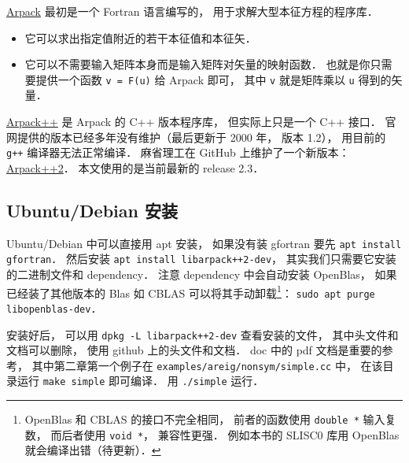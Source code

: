 
\begin{issues}
\issueDraft
\end{issues}


\href{https://www.caam.rice.edu/software/ARPACK/}{Arpack} 最初是一个 Fortran 语言编写的， 用于求解大型本征方程的程序库．
\begin{itemize}
\item 它可以求出指定值附近的若干本征值和本征矢．
\item 它可以不需要输入矩阵本身而是输入矩阵对矢量的映射函数． 也就是你只需要提供一个函数 \verb|v = F(u)| 给 Arpack 即可， 其中 \verb|v| 就是矩阵乘以 \verb|u| 得到的矢量．
\end{itemize}

\href{http://www.ime.unicamp.br/~chico/arpack++/}{Arpack++} 是 Arpack 的 C++ 版本程序库， 但实际上只是一个 C++ 接口． 官网提供的版本已经多年没有维护（最后更新于 2000 年， 版本 1.2）， 用目前的 \verb|g++| 编译器无法正常编译． 麻省理工在 GitHub 上维护了一个新版本： \href{https://github.com/m-reuter/arpackpp}{Arpack++2}． 本文使用的是当前最新的 release 2.3．

\subsection{Ubuntu/Debian 安装}
Ubuntu/Debian 中可以直接用 apt 安装， 如果没有装 gfortran 要先 \verb|apt install gfortran|． 然后安装 \verb|apt install libarpack++2-dev|， 其实我们只需要它安装的二进制文件和 dependency． 注意 dependency 中会自动安装 OpenBlas， 如果已经装了其他版本的 Blas 如 CBLAS 可以将其手动卸载\footnote{OpenBlas 和 CBLAS 的接口不完全相同， 前者的函数使用 \lstinline|double *| 输入复数， 而后者使用 \verb|void *|， 兼容性更强． 例如本书的 SLISC0 库用 OpenBlas 就会编译出错（待更新）．}： \verb|sudo apt purge libopenblas-dev|．

安装好后， 可以用 \verb|dpkg -L libarpack++2-dev| 查看安装的文件， 其中头文件和文档可以删除， 使用 github 上的头文件和文档． doc 中的 pdf 文档是重要的参考， 其中第二章第一个例子在 \verb|examples/areig/nonsym/simple.cc| 中， 在该目录运行 \verb|make simple| 即可编译． 用 \verb|./simple| 运行．

